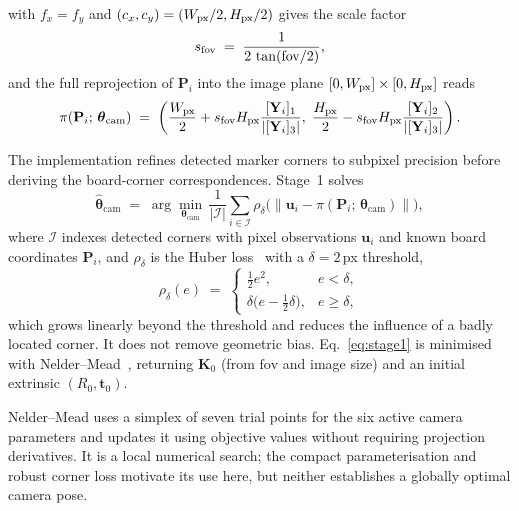 with $f_x=f_y$ and $(c_x,c_y)=(W_{\rm px}/2,H_{\rm px}/2)$
gives the scale factor
\begin{equation}
\label{eq:scale}
    s_{\rm fov} \;=\; \frac{1}{2\,\tan(\mathrm{fov}/2)},
\end{equation}
and the full reprojection of $\mathbf{P}_{i}$ into the image plane
$[0,W_{\rm px}]\times[0,H_{\rm px}]$ reads
\begin{equation}
\label{eq:project}
    \pi(\mathbf{P}_{i};\,\boldsymbol{\theta}_{\mathrm{cam}})
    \;=\;
    \left(
        \frac{W_{\rm px}}{2}
        +s_{\rm fov}H_{\rm px}
         \frac{[\mathbf{Y}_{i}]_{1}}{|[\mathbf{Y}_{i}]_{3}|},\;
        \frac{H_{\rm px}}{2}
        -s_{\rm fov}H_{\rm px}
         \frac{[\mathbf{Y}_{i}]_{2}}{|[\mathbf{Y}_{i}]_{3}|}
    \right).
\end{equation}

The implementation refines detected marker corners to subpixel
precision before deriving the board-corner correspondences. Stage~1 solves
\begin{equation}
\label{eq:stage1}
    \hat{\boldsymbol{\theta}}_{\mathrm{cam}}
    \;=\;
    \arg\min_{\boldsymbol{\theta}_{\mathrm{cam}}}\,
    \frac{1}{|\mathcal{I}|}
    \sum_{i \in \mathcal{I}}
    \rho_{\delta}\!\bigl(
      \|\mathbf{u}_{i} - \pi(\mathbf{P}_{i};\,\boldsymbol{\theta}_{\mathrm{cam}})\|
    \bigr),
\end{equation}
where $\mathcal{I}$ indexes detected corners with pixel observations
$\mathbf{u}_{i}$ and known board coordinates $\mathbf{P}_{i}$, and
$\rho_{\delta}$ is the Huber loss~\cite{huber1964robust} with a
$\delta = 2$\,px threshold,
\begin{equation}
\label{eq:huber}
    \rho_{\delta}(e)
    \;=\;
    \begin{cases}
        \tfrac{1}{2}e^{2}, & e < \delta, \\
        \delta\bigl(e - \tfrac{1}{2}\delta\bigr), & e \ge \delta,
    \end{cases}
\end{equation}
which grows linearly beyond the threshold and reduces the influence
of a badly located corner. It does not remove geometric bias.
Eq.~\eqref{eq:stage1} is minimised with
Nelder--Mead~\cite{nelder1965simplex}, returning
$\mathbf{K}_{0}$ (from $\mathrm{fov}$ and image size) and an initial
extrinsic $(R_{0}, \mathbf{t}_{0})$.

Nelder--Mead uses a simplex of seven trial points for the six active
camera parameters and updates it using objective values without
requiring projection derivatives. It is a local numerical search;
the compact parameterisation and robust corner loss motivate its use
here, but neither establishes a globally optimal camera pose.

